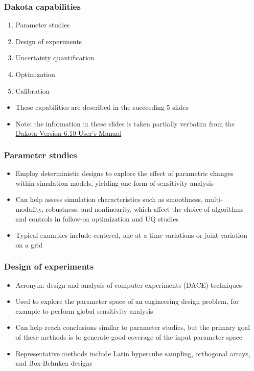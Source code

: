 \documentclass[t]{beamer}
\begin{document}

\begin{frame}
  \frametitle{Dakota capabilities}
  \begin{enumerate}[1]
    \item Parameter studies
    \item Design of experiments
    \item Uncertainty quantification
    \item Optimization
    \item Calibration
  \end{enumerate}
  \vskip 0.5in
  \begin{itemize}
    \item These capabilities are described in the succeeding 5 slides
    \item Note: the information in these slides is taken partially verbatim from
          the \href{https://dakota.sandia.gov/content/manuals}{Dakota Version
          6.10 User's Manual}
  \end{itemize}
\end{frame}


\begin{frame}
  \frametitle{Parameter studies}
  \begin{itemize}
    \item Employ deterministic designs to explore the effect of parametric
          changes within simulation models, yielding one form of sensitivity
          analysis
    \item Can help assess simulation characteristics such as smoothness,
          multi-modality, robustness, and nonlinearity, which affect the choice
          of algorithms and controls in follow-on optimization and UQ studies
    \item Typical examples include centered, one-at-a-time variations or joint
          variation on a grid
  \end{itemize}
\end{frame}


\begin{frame}
  \frametitle{Design of experiments}
  \begin{itemize}
    \item Acronym: design and analysis of computer experiments (DACE) techniques
    \item Used to explore the parameter space of an engineering design problem,
          for example to perform global sensitivity analysis
    \item Can help reach conclusions similar to parameter studies, but the
          primary goal of these methods is to generate good coverage of the
          input parameter space
    \item Representative methods include Latin hypercube sampling, orthogonal
          arrays, and Box-Behnken designs
  \end{itemize}
\end{frame}
\end{document}
